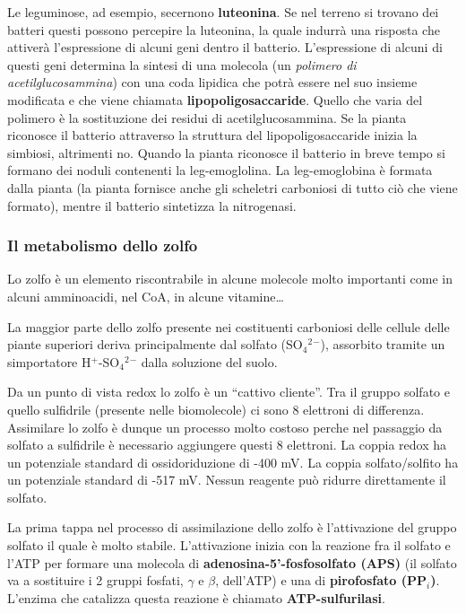 \documentclass[]{article}
\begin{document}
Le leguminose, ad esempio, secernono \textbf{luteonina}. Se nel terreno
si trovano dei batteri questi possono percepire la luteonina, la quale
indurrà una risposta che attiverà l'espressione di alcuni geni dentro il
batterio. L'espressione di alcuni di questi geni determina la sintesi di
una molecola (un \emph{polimero di acetilglucosammina}) con una coda
lipidica che potrà essere nel suo insieme modificata e che viene
chiamata \textbf{lipopoligosaccaride}. Quello che varia del polimero è
la sostituzione dei residui di acetilglucosammina. Se la pianta
riconosce il batterio attraverso la struttura del lipopoligosaccaride
inizia la simbiosi, altrimenti no. Quando la pianta riconosce il
batterio in breve tempo si formano dei noduli contenenti la
leg-emoglolina. La leg-emoglobina è formata dalla pianta (la pianta
fornisce anche gli scheletri carboniosi di tutto ciò che viene formato),
mentre il batterio sintetizza la nitrogenasi.

\subsubsection{Il metabolismo dello
zolfo}\label{il-metabolismo-dello-zolfo}

Lo zolfo è un elemento riscontrabile in alcune molecole molto importanti
come in alcuni amminoacidi, nel CoA, in alcune vitamine\ldots{}

La maggior parte dello zolfo presente nei costituenti carboniosi delle
cellule delle piante superiori deriva principalmente dal solfato
(SO$_4$$^2$$^-$), assorbito tramite un simportatore H$^+$-SO$_4$$^2$$^-$
dalla soluzione del suolo.

Da un punto di vista redox lo zolfo è un ``cattivo cliente''. Tra il
gruppo solfato e quello sulfidrile (presente nelle biomolecole) ci sono
8 elettroni di differenza. Assimilare lo zolfo è dunque un processo
molto costoso perche nel passaggio da solfato a sulfidrile è necessario
aggiungere questi 8 elettroni. La coppia redox ha un potenziale standard
di ossidoriduzione di -400 mV. La coppia solfato/solfito ha un
potenziale standard di -517 mV. Nessun reagente può ridurre direttamente
il solfato.

La prima tappa nel processo di assimilazione dello zolfo è l'attivazione
del gruppo solfato il quale è molto stabile. L'attivazione inizia con la
reazione fra il solfato e l'ATP per formare una molecola di
\textbf{adenosina-5'-fosfosolfato (APS)} (il solfato va a sostituire i 2
gruppi fosfati, $\gamma$ e $\beta$, dell'ATP) e una di
\textbf{pirofosfato (PP$_i$)}. L'enzima che catalizza questa reazione è
chiamato \textbf{ATP-sulfurilasi}.
\end{document}
